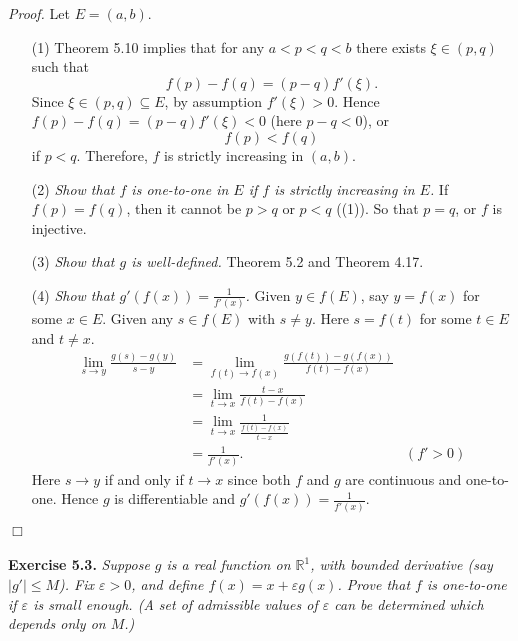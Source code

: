 \documentclass{article}
\begin{document}
\emph{Proof.}
Let $E = (a,b)$.
\begin{enumerate}
\item[(1)]
Theorem 5.10 implies that
for any $a < p < q < b$ there exists $\xi \in (p,q)$ such that
\[
  f(p)-f(q) = (p-q)f'(\xi).
\]
Since $\xi \in (p,q) \subseteq E$, by assumption $f'(\xi) > 0$.
Hence $f(p)-f(q) = (p-q)f'(\xi) < 0$ (here $p-q < 0$), or
\[
  f(p) < f(q)
\]
if $p < q$.
Therefore, $f$ is strictly increasing in $(a,b)$.

\item[(2)]
\emph{Show that $f$ is one-to-one in $E$ if $f$ is strictly increasing in $E$.}
If $f(p) = f(q)$, then it cannot be $p > q$ or $p < q$ ((1)).
So that $p = q$, or $f$ is injective.

\item[(3)]
\emph{Show that $g$ is well-defined.}
Theorem 5.2 and Theorem 4.17.

\item[(4)]
\emph{Show that $ g'(f(x)) = \frac{1}{f'(x)}$.}
Given $y \in f(E)$, say $y = f(x)$ for some $x \in E$.
Given any $s \in f(E)$ with $s \neq y$.
Here $s = f(t)$ for some $t \in E$ and $t \neq x$.
\begin{align*}
  \lim_{s \to y} \frac{g(s) - g(y)}{s - y}
  &= \lim_{f(t) \to f(x)} \frac{g(f(t)) - g(f(x))}{f(t) - f(x)} \\
  &= \lim_{t \to x} \frac{t - x}{f(t) - f(x)} \\
  &= \lim_{t \to x} \frac{1}{\frac{f(t) - f(x)}{t - x}} \\
  &=\frac{1}{f'(x)}.
    &(f' > 0)
\end{align*}
Here $s \to y$ if and only if $t \to x$ since both $f$ and $g$
are continuous and one-to-one.
Hence $g$ is differentiable and $g'(f(x)) = \frac{1}{f'(x)}$.
\end{enumerate}
$\Box$ \\\\






\textbf{Exercise 5.3.}
\emph{Suppose $g$ is a real function on $\mathbb{R}^1$,
with bounded derivative (say $|g'|\leq M$).
Fix $\varepsilon > 0$, and define $f(x)=x+\varepsilon g(x)$.
Prove that $f$ is one-to-one if $\varepsilon$ is small enough.
(A set of admissible values of $\varepsilon$ can be determined which depends only on $M$.)} \\
\end{document}
